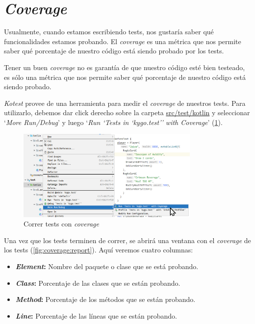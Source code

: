 \section{\textit{Coverage}}
  
  Usualmente, cuando estamos escribiendo tests, nos gustaría saber qué funcionalidades estamos
  probando.
  El \textit{coverage} es una métrica que nos permite saber qué porcentaje de nuestro código
  está siendo probado por los tests.

  \begin{important}
    Tener un buen \textit{coverage} no es garantía de que nuestro código esté bien testeado, es sólo
    una métrica que nos permite saber qué porcentaje de nuestro código está siendo probado.
  \end{important}

  \textit{Kotest} provee de una herramienta para medir el \textit{coverage} de nuestros tests.
  Para utilizarlo, debemos dar click derecho sobre la carpeta \url{src/test/kotlin} y seleccionar
  `\textit{More Run/Debug}' y luego `\textit{Run `Tests in `kygo.test'' with Coverage}' 
  (\cref{fig:coverage}).

  \begin{figure}[ht!]
    \centering
    \includegraphics[width=0.8\textwidth]{img/oop/strategy/run_with_coverage.png}
    \caption{Correr tests con \textit{coverage}}
    \label{fig:coverage}
  \end{figure}

  Una vez que los tests terminen de correr, se abrirá una ventana con el \textit{coverage} de los
  tests (\cref{fig:coverage:report}).
  Aquí veremos cuatro columnas:

  \begin{itemize}
    \item \textbf{\textit{Element}:} Nombre del paquete o clase que se está probando.
    \item \textbf{\textit{Class}:} Porcentaje de las clases que se están probando.
    \item \textbf{\textit{Method}:} Porcentaje de los métodos que se están probando.
    \item \textbf{\textit{Line}:} Porcentaje de las líneas que se están probando.
  \end{itemize}

